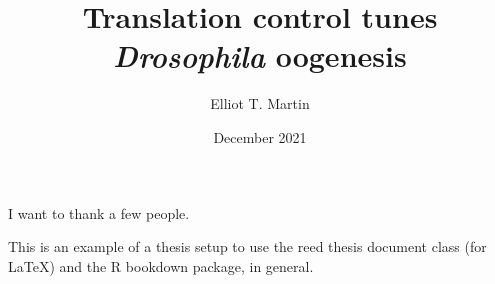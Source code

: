 \documentclass[12pt,twoside]{reedthesis}
\title{Translation control tunes \emph{Drosophila} oogenesis}
\author{Elliot T. Martin}
\date{December 2021}
\begin{document}
  \maketitle

\frontmatter %
\pagestyle{empty} %
  \begin{acknowledgements}
    I want to thank a few people.
  \end{acknowledgements}
  \begin{preface}
    This is an example of a thesis setup to use the reed thesis document class
    (for LaTeX) and the R bookdown package, in general.
  \end{preface}
  \hypersetup{linkcolor=black}
  \setcounter{secnumdepth}{2}
  \setcounter{tocdepth}{2}
  \tableofcontents

  \listoftables
\end{document}
